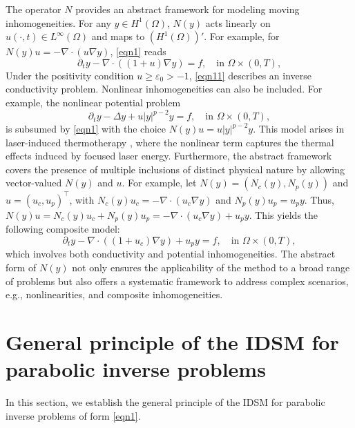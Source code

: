 \documentclass[onefignum,onetabnum]{siamart190516}
\numberwithin{equation}{section}
\begin{document}
The operator $N$ provides an abstract framework for modeling moving inhomogeneities.
For any $y \in H^{1}(\Omega)$, $N(y)$ acts linearly on $u(\cdot,t) \in L^{\infty}(\Omega)$ and maps to $(H^{1}(\Omega))'$.
For example, for $N(y)u = -\nabla \cdot (u \nabla y)$, \eqref{eqn1} reads
\begin{equation}\label{eqn11}
\partial_{t} y - \nabla \cdot \left((1 + u) \nabla y \right) = f,\quad \text{in } \Omega \times (0,T),
\end{equation}
Under the positivity condition $u \geq \varepsilon_{0} > -1$, \eqref{eqn11} describes an inverse conductivity problem.
Nonlinear inhomogeneities can also be included.
For example, the nonlinear potential problem
\begin{equation}\label{eqn13}
\partial_{t} y - \Delta y + u |y|^{p-2} y = f, \quad \text{in } \Omega \times (0,T),
\end{equation}
is subsumed by \eqref{eqn1} with the choice $N(y)u = u |y|^{p-2} y$.
This model arises in laser-induced thermotherapy \cite{shuailu2019uniqueness}, where the nonlinear term captures the thermal effects induced by focused laser energy.
Furthermore, the abstract framework covers the presence of multiple inclusions of distinct physical nature by allowing vector-valued $N(y)$ and $u$.
For example, let $N(y) = (N_{c}(y), {N_{p}}(y))$ and $u = (u_{c}, u_{p})^{\top}$, with $N_{c}(y)u_{c} = -\nabla \cdot (u_{c} \nabla y)$ and $N_{p}(y)u_{p} = u_{p} y$.
Thus, $N(y)u = N_{c}(y)u_{c} + N_{p}(y)u_{p} = -\nabla \cdot (u_{c} \nabla y) + u_{p} y$.
This yields the following composite model:
\begin{equation}\label{eqn6}
\partial_{t} y - \nabla \cdot \left((1 + u_{c}) \nabla y \right) + u_{p} y = f,\quad \text{in } \Omega \times (0,T),
\end{equation}
which involves both conductivity and potential inhomogeneities.
The abstract form of $N(y)$ not only ensures the applicability of the method to a broad range of problems but also offers a systematic framework to address complex scenarios, e.g., nonlinearities, and composite inhomogeneities.

\section{General principle of the IDSM for parabolic inverse problems}\label{sec:PRI}
In this section, we establish the general principle of the IDSM for parabolic inverse problems of form \eqref{eqn1}.
\end{document}
